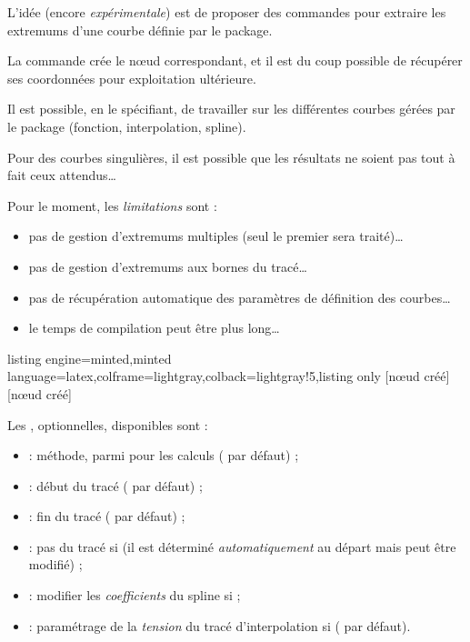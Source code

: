 \documentclass[11pt,a4paper]{ltxdoc}
\begin{document}
L'idée (encore \textit{expérimentale}) est de proposer des commandes pour extraire les extremums d'une courbe définie par le package.

La commande crée le nœud correspondant, et il est du coup possible de récupérer ses coordonnées pour exploitation ultérieure.

\smallskip

Il est possible, en le spécifiant, de travailler sur les différentes courbes gérées par le package (fonction, interpolation, spline).

Pour des courbes singulières, il est possible que les résultats ne soient pas tout à fait ceux attendus\ldots

\smallskip

{\small\faBomb} Pour le moment, les \textit{limitations} sont :

\begin{itemize}
  \item pas de gestion d'extremums multiples (seul le premier sera traité)\ldots
  \item pas de gestion d'extremums aux bornes du tracé\ldots
  \item pas de récupération automatique des paramètres de définition des courbes\ldots
  \item le temps de compilation peut être plus long\ldots
\end{itemize}

\begin{tcblisting}{listing engine=minted,minted language=latex,colframe=lightgray,colback=lightgray!5,listing only}
[nœud créé]
[nœud créé]
\end{tcblisting}

Les \MontreCode{[clés]}, optionnelles, disponibles sont :

\smallskip

\begin{itemize}
  \item {} : méthode, parmi  pour les calculs ( par défaut) ;
  \item {} : début du tracé ( par défaut) ;
  \item {} : fin du tracé ( par défaut) ;
  \item {} : pas du tracé si  (il est déterminé \textit{automatiquement} au départ mais peut être modifié) ;
  \item {} : modifier les \textit{coefficients} du spline si  ;
  \item {} : paramétrage de la \textit{tension} du tracé d'interpolation si ( par défaut).
\end{itemize}
\end{document}
